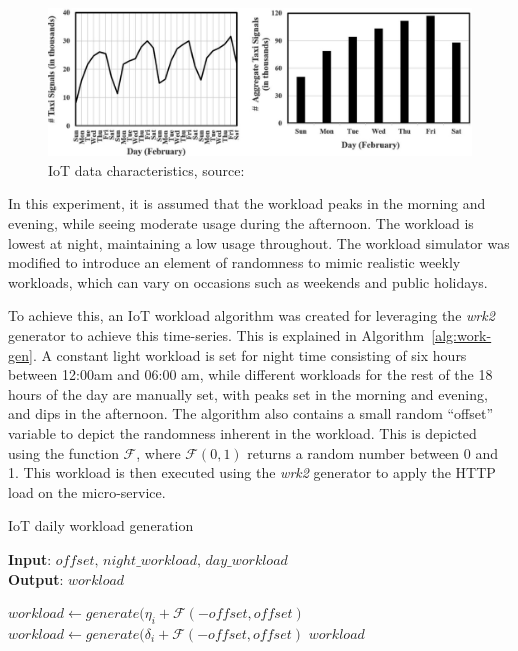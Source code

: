 \begin{figure}[htb]
    \centering
    \caption[IoT data characteristics]{IoT data characteristics, source:~\cite{tadakamalla2019characterization}}
    \label{fig:iot-workload-characteristics}
    \includegraphics[width=1.0\linewidth]{Figures/IoT-Workload-Characteristics.pdf}
\end{figure}

In this experiment, it is assumed that the workload peaks in the morning and evening, while seeing moderate usage during the afternoon. The workload is lowest at night, maintaining a low usage throughout. The workload simulator was modified to introduce an element of randomness to mimic realistic weekly workloads, which can vary on occasions such as weekends and public holidays.\par

To achieve this, an IoT workload algorithm was created for leveraging the \textit{wrk2} generator to achieve this time-series. This is explained in Algorithm~\ref{alg:work-gen}. A constant light workload is set for night time consisting of six hours between 12:00am and 06:00 am, while different workloads for the rest of the 18 hours of the day are manually set, with peaks set in the morning and evening, and dips in the afternoon. The algorithm also contains a small random ``offset'' variable to depict the randomness inherent in the workload. This is depicted using the function $\mathcal{F}$, where $\mathcal{F}(0,1)$ returns a random number between 0 and 1. This workload is then executed using the \textit{wrk2} generator to apply the HTTP load on the micro-service.

\begin{algorithm}
    \caption{IoT daily workload generation}
    \label{alg:work-gen}
    \textbf{Input}: $offset,\,night\_workload,\,day\_workload$\\
    \textbf{Output}: $workload$
    \begin{algorithmic}
            \State $workload \gets generate(\eta_{i} + \mathcal{F}(-offset,offset)$
        \EndFor
            \State $workload \gets generate(\delta_{i} + \mathcal{F}(-offset,offset)$
        \EndFor
        \State \Return $workload$
    \end{algorithmic}
\end{algorithm}

